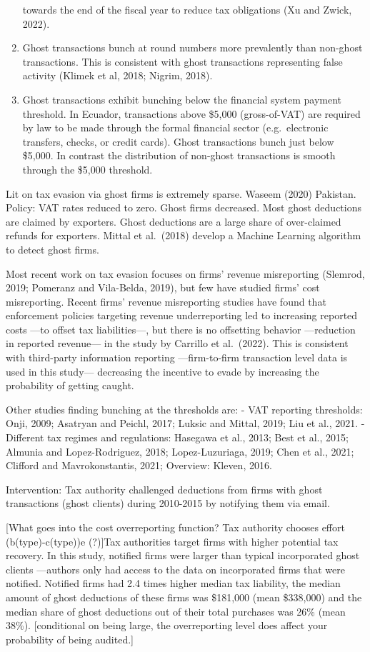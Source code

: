 \documentclass[
  12pt]{article}
\theoremstyle{definition}
\theoremstyle{remark}
\begin{document}
\begin{enumerate}
  towards the end of the fiscal year to reduce tax obligations (Xu and
  Zwick, 2022).
\item
  Ghost transactions bunch at round numbers more prevalently than
  non-ghost transactions. This is consistent with ghost transactions
  representing false activity (Klimek et al, 2018; Nigrim, 2018).
\item
  Ghost transactions exhibit bunching below the financial system payment
  threshold. In Ecuador, transactions above \$5,000 (gross-of-VAT) are
  required by law to be made through the formal financial sector
  (e.g.~electronic transfers, checks, or credit cards). Ghost
  transactions bunch just below \$5,000. In contrast the distribution of
  non-ghost transactions is smooth through the \$5,000 threshold.
\end{enumerate}

Lit on tax evasion via ghost firms is extremely sparse. Waseem (2020)
Pakistan. Policy: VAT rates reduced to zero. Ghost firms decreased. Most
ghost deductions are claimed by exporters. Ghost deductions are a large
share of over-claimed refunds for exporters. Mittal et al.~(2018)
develop a Machine Learning algorithm to detect ghost firms.

Most recent work on tax evasion focuses on firms' revenue misreporting
(Slemrod, 2019; Pomeranz and Vila-Belda, 2019), but few have studied
firms' cost misreporting. Recent firms' revenue misreporting studies
have found that enforcement policies targeting revenue underreporting
led to increasing reported costs ---to offset tax liabilities---, but
there is no offsetting behavior ---reduction in reported revenue--- in
the study by Carrillo et al.~(2022). This is consistent with third-party
information reporting ---firm-to-firm transaction level data is used in
this study--- decreasing the incentive to evade by increasing the
probability of getting caught.

Other studies finding bunching at the thresholds are: - VAT reporting
thresholds: Onji, 2009; Asatryan and Peichl, 2017; Luksic and Mittal,
2019; Liu et al., 2021. - Different tax regimes and regulations:
Hasegawa et al., 2013; Best et al., 2015; Almunia and Lopez-Rodriguez,
2018; Lopez-Luzuriaga, 2019; Chen et al., 2021; Clifford and
Mavrokonstantis, 2021; Overview: Kleven, 2016.

Intervention: Tax authority challenged deductions from firms with ghost
transactions (ghost clients) during 2010-2015 by notifying them via
email.

{[}What goes into the cost overreporting function? Tax authority chooses
effort (b(type)-c(type))e (?){]}Tax authorities target firms with higher
potential tax recovery. In this study, notified firms were larger than
typical incorporated ghost clients ---authors only had access to the
data on incorporated firms that were notified. Notified firms had 2.4
times higher median tax liability, the median amount of ghost deductions
of these firms was \$181,000 (mean \$338,000) and the median share of
ghost deductions out of their total purchases was 26\% (mean 38\%).
{[}conditional on being large, the overreporting level does affect your
probability of being audited.{]}
\end{document}
